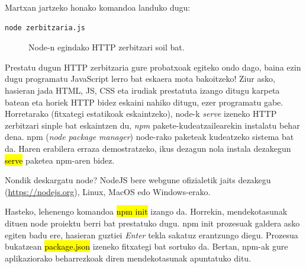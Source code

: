 Martxan jartzeko honako komandoa landuko dugu:

\begin{lstlisting}[language=Bash,numbers=none]
   node zerbitzaria.js
\end{lstlisting}



\begin{figure}[ht]
	\centering
{}
\caption{Node-n egindako HTTP zerbitzari soil bat.}
\label{fig:node1}
\end{figure}

Prestatu dugun HTTP zerbitzaria gure probatxoak egiteko ondo dago, baina ezin dugu programatu JavaScript lerro bat eskaera mota bakoitzeko! Ziur asko, hasieran jada HTML, JS, CSS eta irudiak prestatuta izango ditugu karpeta batean eta horiek HTTP bidez eskaini nahiko ditugu, ezer programatu gabe. Horretarako (fitxategi estatikoak eskaintzeko), node-k \textit{serve}  izeneko HTTP zerbitzari sinple bat eskaintzen du, \textit{npm} pakete-kudeatzailearekin instalatu behar dena. npm (\textit{node package manager}) node-rako paketeak kudeatzeko sistema bat da. Haren erabilera erraza demostratzeko, ikus dezagun nola instala dezakegun \hl{serve} paketea npm-aren bidez.

\begin{alertinfo}{Nondik deskargatu node?}
  NodeJS bere webgune ofizialetik jaits dezakegu (\href{https://nodejs.org}{https://nodejs.org}), Linux, MacOS edo Windows-erako.
\end{alertinfo}

Hasteko, lehenengo komandoa \hl{npm init} izango da. Horrekin, mendekotasunak dituen node proiektu berri bat prestatuko dugu. npm init prozesuak galdera asko egiten badu ere, hasieran guztiei \textit{Enter} tekla sakatuz erantzungo diegu. Prozesua bukatzean \hl{package.json} izeneko fitxategi bat sortuko da. Bertan, npm-ak gure aplikaziorako beharrezkoak diren mendekotasunak apuntatuko ditu.

